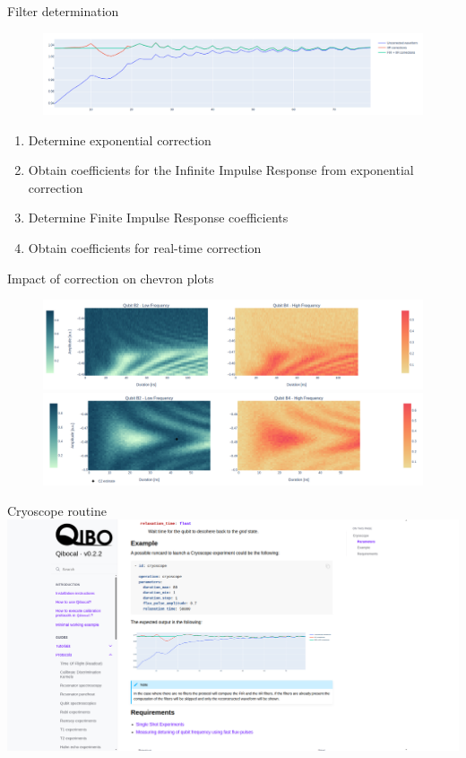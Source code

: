 \documentclass[aspectratio=169,10pt]{beamer}
\begin{document}
\begin{frame}{Filter determination}
  \begin{figure}
    \centering
    \includegraphics[width=\textwidth]{figures/B4_ringin.png}
  \end{figure}
  \vspace{0.5em}
  \begin{enumerate}[leftmargin=*, label=\arabic*.]
    \item<1-> Determine exponential correction
    \item<2-> Obtain coefficients for the Infinite Impulse Response from exponential correction
    \item<3-> Determine Finite Impulse Response coefficients
    \item<4-> Obtain coefficients for real-time correction
  \end{enumerate}
\end{frame}

\begin{frame}{Impact of correction on chevron plots}
  \begin{figure}
    \centering
    \includegraphics[width=\textwidth]{figures/B2B4_nofilter.png}
    \vfill
    \includegraphics[width=\textwidth]{figures/B2B4.png}
  \end{figure}
\end{frame}

\begin{frame}{Cryoscope routine}
  \centering
  \includegraphics[height=\textheight]{figures/cryoscope_routine.png}
\end{frame}
\end{document}
